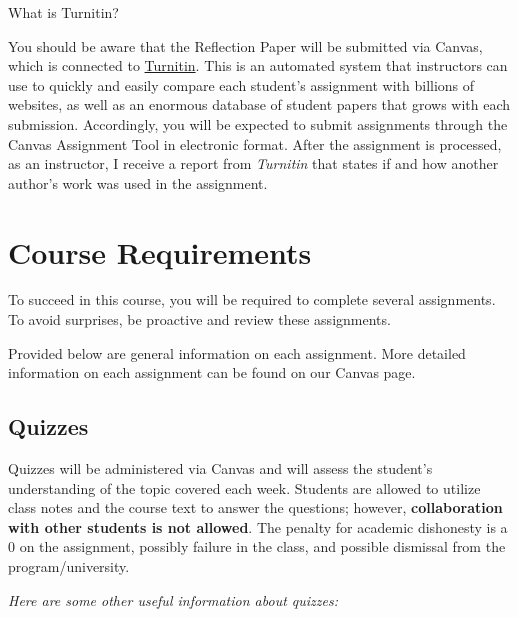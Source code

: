 \documentclass[11pt,]{article}
\begin{document}
What is Turnitin?

You should be aware that the Reflection Paper will be submitted via
Canvas, which is connected to
\href{https://www.turnitin.com/}{Turnitin}. This is an automated system
that instructors can use to quickly and easily compare each student's
assignment with billions of websites, as well as an enormous database of
student papers that grows with each submission. Accordingly, you will be
expected to submit assignments through the Canvas Assignment Tool in
electronic format. After the assignment is processed, as an instructor,
I receive a report from \emph{Turnitin} that states if and how another
author's work was used in the assignment.

\hypertarget{course-requirements}{%
\section{Course Requirements}\label{course-requirements}}

To succeed in this course, you will be required to complete several
assignments. To avoid surprises, be proactive and review these
assignments.

Provided below are general information on each assignment. More detailed
information on each assignment can be found on our Canvas page.

\hypertarget{quizzes}{%
\subsection{Quizzes}\label{quizzes}}

Quizzes will be administered via Canvas and will assess the student's
understanding of the topic covered each week. Students are allowed to
utilize class notes and the course text to answer the questions;
however, \textbf{collaboration with other students is not allowed}. The
penalty for academic dishonesty is a 0 on the assignment, possibly
failure in the class, and possible dismissal from the
program/university.

\emph{Here are some other useful information about quizzes:}
\end{document}
